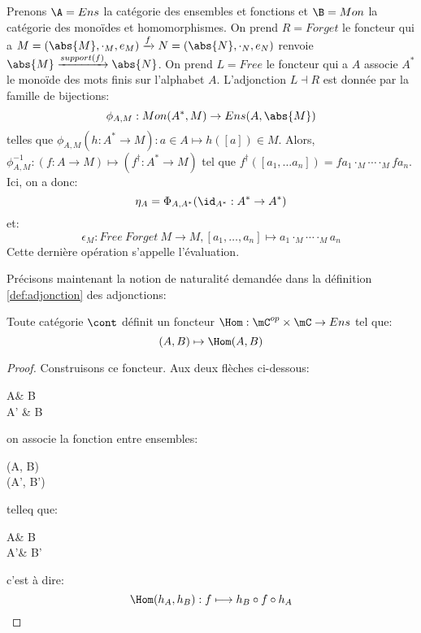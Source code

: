 \documentclass[math, info]{cours}
\begin{document}
\begin{exemple}
	Prenons $\A = Ens$ la catégorie des ensembles et fonctions et $\B = Mon$ la catégorie des monoïdes et homomorphismes.
	On prend $R = Forget$ le foncteur qui a $M = (\abs{M}, \cdot_{M}, e_{M}) \xrightarrow{f} N = (\abs{N}, \cdot_{N}, e_{N})$ renvoie $\abs{M} \xrightarrow{support(f)} \abs{N}$.
	On prend $L = Free$ le foncteur qui a $A$ associe $A^{*}$ le monoïde des mots finis sur l'alphabet $A$.
	L'adjonction $L \dashv R$ est donnée par la famille de bijections:
	\begin{equation*}
		\phi_{A, M}: Mon(A^{*}, M) \to Ens(A, \abs{M})
	\end{equation*}
	telles que
	$\phi_{A, M}(h : A^{*} \to M): a\in A \mapsto h([a]) \in M$.
	Alors, $\phi_{A, M}^{-1}: (f: A\to M) \mapsto (f^{\dag}: A^{*} \to M)$ tel que $f^{\dag}([a_{1}, \ldots a_{n}]) = fa_{1}\cdot_{M} \cdots \cdot_{M}fa_{n}$.
	Ici, on a donc:
	\begin{equation*}
		\eta_{A} = \Phi_{A, A^{*}}(\id_{A^{*}}: A^{*} \to A^{*})
	\end{equation*}
	et:
	\begin{equation*}
		\epsilon_{M}: Free\ Forget\ M \to M, [a_{1}, \ldots, a_{n}] \mapsto a_{1}\cdot_{M} \cdots \cdot_{M}a_{n}
	\end{equation*}
	Cette dernière opération s'appelle l'évaluation.
\end{exemple}

Précisons maintenant la notion de naturalité demandée dans la définition \ref{def:adjonction} des adjonctions:
\begin{proposition}
	Toute catégorie $\cont$ définit un foncteur $\Hom: \mC^{op}\times\mC \to Ens$ tel que:
	\begin{equation*}
		(A, B) \mapsto \Hom(A, B)
	\end{equation*}
\end{proposition}
\begin{proof}
	Construisons ce foncteur. Aux deux flèches ci-dessous:
	\begin{category}
		A\ar[d, "h_{A}"] & B\ar[d, "h_{B}"]\\
		A'  & B
	\end{category}
	on associe la fonction entre ensembles:
	\begin{category}
		\Hom(A, B)\ar[d, "\Hom(h_{A}; h_{B})"]\\
		\Hom(A', B')
	\end{category}
	telleq que:
	\begin{category}
		A\ar[r, "f"] & B\ar[d, "h_{B}"]\\
		A'\ar[u, "h_{A}"]\ar[r, "h_{B} \circ f\circ h_{A}"'] & B'
	\end{category}
	c'est à dire:
	\begin{equation*}
		\Hom(h_{A}, h_{B}): f \longmapsto h_{B} \circ f \circ h_{A}
	\end{equation*}
\end{proof}
\end{document}
